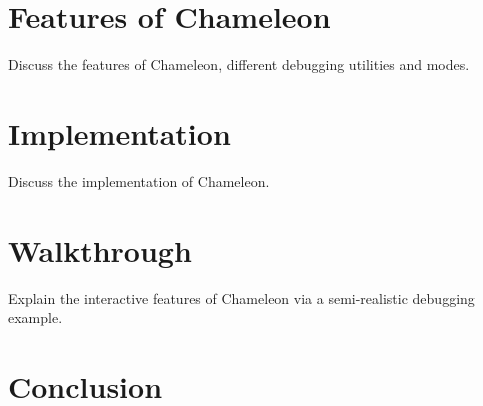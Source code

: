 \section{Features of Chameleon}

Discuss the features of Chameleon, different debugging utilities and modes.

\section{Implementation}

Discuss the implementation of Chameleon. 

\section{Walkthrough}

Explain the interactive features of Chameleon via a semi-realistic debugging example.

\section{Conclusion}
